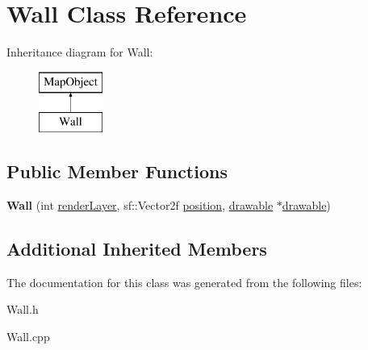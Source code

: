 \hypertarget{class_wall}{}\section{Wall Class Reference}
\label{class_wall}
Inheritance diagram for Wall\+:\begin{figure}[H]
\begin{center}
\leavevmode
\includegraphics[height=2.000000cm]{class_wall}
\end{center}
\end{figure}
\subsection*{Public Member Functions}
\begin{DoxyCompactItemize}
\item 
\hypertarget{class_wall_a1be3f5900e0ec7871fb810a0ebbacfa6}{}{\bfseries Wall} (int \hyperlink{class_map_object_ac7431860a4ca955dc3db173926be3856}{render\+Layer}, sf\+::\+Vector2f \hyperlink{class_map_object_a00491cbf8e4cbc729ef37e11f3473860}{position}, \hyperlink{classdrawable}{drawable} $\ast$\hyperlink{classdrawable}{drawable})\label{class_wall_a1be3f5900e0ec7871fb810a0ebbacfa6}

\end{DoxyCompactItemize}
\subsection*{Additional Inherited Members}


The documentation for this class was generated from the following files\+:\begin{DoxyCompactItemize}
\item 
Wall.\+h\item 
Wall.\+cpp\end{DoxyCompactItemize}
